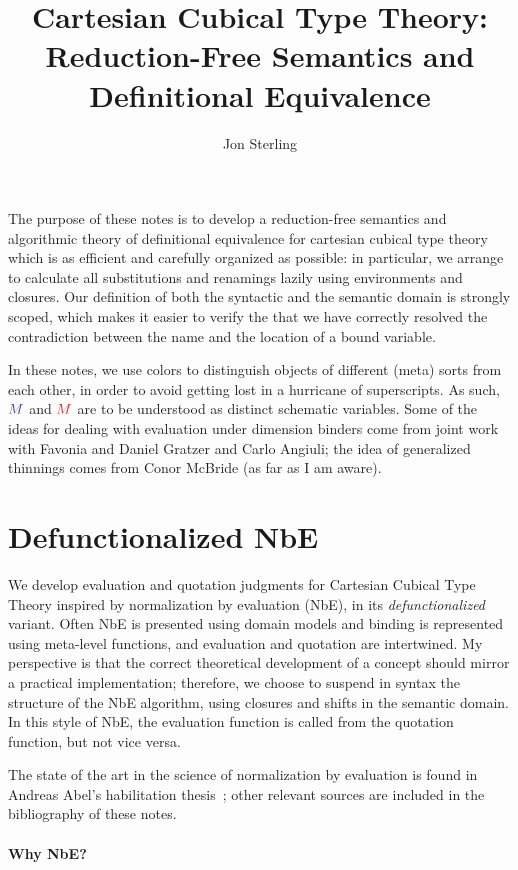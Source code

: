 \documentclass{article}
\title{Cartesian Cubical Type Theory:\\ Reduction-Free Semantics and
  Definitional Equivalence} \author{Jon Sterling}
\newcommand\FmtTm[1]{{\color{Violet}#1}}
\newcommand\FmtVal[1]{{\color{Red}{#1}}}
\begin{document}
\maketitle

The purpose of these notes is to develop a reduction-free semantics
and algorithmic theory of definitional equivalence for cartesian
cubical type theory which is as efficient and carefully organized as
possible: in particular, we arrange to calculate all substitutions and
renamings lazily using environments and closures. Our definition of
both the syntactic and the semantic domain is strongly scoped, which
makes it easier to verify the that we have correctly resolved the
contradiction between the name and the location of a bound variable.

In these notes, we use colors to distinguish objects of different
(meta) sorts from each other, in order to avoid getting lost in a
hurricane of superscripts. As such, $\FmtTm{M}$ and $\FmtVal{M}$ are
to be understood as distinct schematic variables. Some of the ideas
for dealing with evaluation under dimension binders come from joint
work with Favonia and Daniel Gratzer and Carlo Angiuli; the idea of
generalized thinnings comes from Conor McBride (as far as I am aware).

\section{Defunctionalized NbE}

We develop evaluation and quotation judgments for Cartesian Cubical
Type Theory inspired by normalization by evaluation (NbE), in its
\emph{defunctionalized} variant. Often NbE is presented using domain
models and binding is represented using meta-level functions, and
evaluation and quotation are intertwined. My perspective is that the
correct theoretical development of a concept should mirror a practical
implementation; therefore, we choose to suspend in syntax the
structure of the NbE algorithm, using closures and shifts in the
semantic domain. In this style of NbE, the evaluation function is
called from the quotation function, but not vice versa.

The state of the art in the science of normalization by evaluation is found in
Andreas Abel's habilitation thesis~\citep{abel:2013}; other relevant sources are included in the bibliography of these notes.

\paragraph{Why NbE?}
\end{document}
